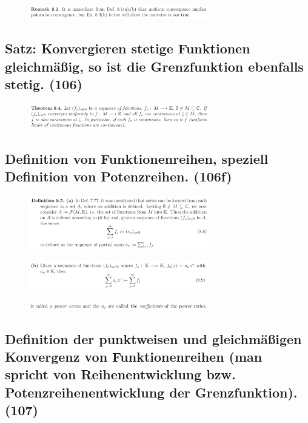 \begin{figure}[H] \centering
\includegraphics[width=0.7\textwidth]{media/8-12.png}
\end{figure}

\subsection{Satz: Konvergieren stetige Funktionen gleichmäßig, so ist die Grenzfunktion ebenfalls stetig. (106)}

\begin{figure}[H] \centering
\includegraphics[width=0.7\textwidth]{media/8-13.png}
\end{figure}

\subsection{Definition von Funktionenreihen, speziell Definition von Potenzreihen. (106f)}

\begin{figure}[H] \centering
\includegraphics[width=0.7\textwidth]{media/8-14.png}
\end{figure}
\begin{figure}[H] \centering
\includegraphics[width=0.7\textwidth]{media/8-14-2.png}
\end{figure}
\begin{figure}[H] \centering
\includegraphics[width=0.7\textwidth]{media/8-14-3.png}
\end{figure}

\subsection{Definition der punktweisen und gleichmäßigen Konvergenz von Funktionenreihen (man spricht von Reihenentwicklung bzw. Potenzreihenentwicklung der Grenzfunktion). (107)}

